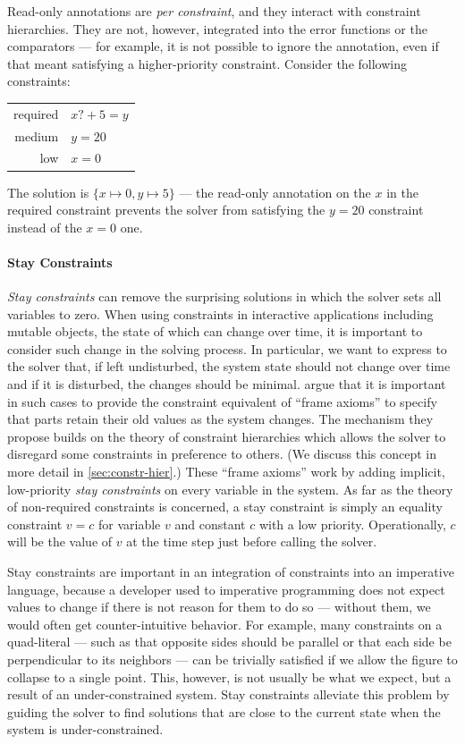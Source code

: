 Read-only annotations are \emph{per constraint}, and they interact
with constraint hierarchies. They are not, however, integrated into
the error functions or the comparators --- for example, it is not
possible to ignore the annotation, even if that meant satisfying a
higher-priority constraint. Consider the following constraints:
\begin{center}
\begin{tabular}{rl}
required &     $x?+5=y$ \\
medium   &     $y=20$ \\
low      &     $x=0$
\end{tabular}
\end{center}
The solution is $\{x \mapsto 0, y \mapsto 5\}$ --- the read-only
annotation on the $x$ in the required constraint prevents the solver
from satisfying the $y=20$ constraint instead of the $x=0$ one.

\paragraph{Stay Constraints}
\label{sec:stay-constraints}
\emph{Stay constraints} can remove the surprising solutions in which
the solver sets all variables to zero. When using constraints in
interactive applications including mutable objects, the state of which
can change over time, it is important to consider such change in the
solving process. In particular, we want to express to the solver that,
if left undisturbed, the system state should not change over time and
if it is disturbed, the changes should be
minimal. \citeauthor{lopez-oopsla-1994} argue that it is important
in such cases to provide the constraint equivalent of ``frame axioms''
to specify that parts retain their old values as the system
changes. The mechanism they propose builds on the theory of constraint
hierarchies which allows the solver to disregard some constraints in
preference to others. (We discuss this concept in more detail in
\autoref{sec:constr-hier}.) These ``frame axioms'' work by adding
implicit, low-priority \emph{stay constraints} on every variable in
the system. As far as the theory of non-required constraints is
concerned, a stay constraint is simply an equality constraint $v=c$
for variable $v$ and constant $c$ with a low priority. Operationally,
$c$ will be the value of $v$ at the time step just before calling the
solver.

Stay constraints are important in an integration of constraints into
an imperative language, because a developer used to imperative
programming does not expect values to change if there is not reason
for them to do so --- without them, we would often get counter-intuitive
behavior. For example, many constraints on a quad-literal --- such as
that opposite sides should be parallel or that each side be
perpendicular to its neighbors --- can be trivially satisfied if we
allow the figure to collapse to a single point. This, however, is not
usually be what we expect, but a result of an under-constrained
system. Stay constraints alleviate this problem by guiding the solver
to find solutions that are close to the current state when the system
is under-constrained.

